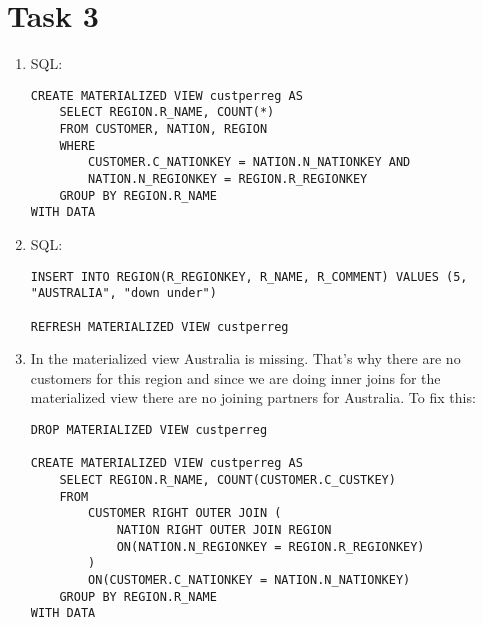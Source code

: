 \documentclass{article}
\begin{document}
	\section*{Task 3}
	\begin{enumerate}[label=(\alph*)]
		\item SQL:
		\begin{lstlisting}[tabsize=2]
CREATE MATERIALIZED VIEW custperreg AS
	SELECT REGION.R_NAME, COUNT(*)
	FROM CUSTOMER, NATION, REGION
	WHERE 
		CUSTOMER.C_NATIONKEY = NATION.N_NATIONKEY AND 
		NATION.N_REGIONKEY = REGION.R_REGIONKEY
	GROUP BY REGION.R_NAME
WITH DATA
		\end{lstlisting}
		\item SQL:
		\begin{lstlisting}
INSERT INTO REGION(R_REGIONKEY, R_NAME, R_COMMENT) VALUES (5, "AUSTRALIA", "down under")

REFRESH MATERIALIZED VIEW custperreg
		\end{lstlisting}
		\item In the materialized view Australia is missing. That's why there are no customers for this region and since we are doing inner joins for the materialized view there are no joining partners for Australia. To fix this:
		\begin{lstlisting}[tabsize=2]
DROP MATERIALIZED VIEW custperreg

CREATE MATERIALIZED VIEW custperreg AS
	SELECT REGION.R_NAME, COUNT(CUSTOMER.C_CUSTKEY)
	FROM 
		CUSTOMER RIGHT OUTER JOIN (
			NATION RIGHT OUTER JOIN REGION 
			ON(NATION.N_REGIONKEY = REGION.R_REGIONKEY)
		) 
		ON(CUSTOMER.C_NATIONKEY = NATION.N_NATIONKEY)
	GROUP BY REGION.R_NAME
WITH DATA
		\end{lstlisting}
	\end{enumerate}
\end{document}
